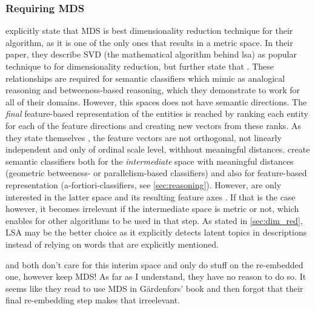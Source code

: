 \subsubsection{Requiring MDS}
\label{sec:discuss_mds}

\textcite{Derrac2015} explicitly state that MDS is best dimensionality reduction technique for their algorithm, as it is one of the only ones that results in a metric space. In their paper, they describe SVD (the mathematical algorithm behind \gls{lsa}) as popular technique to for dimensionality reduction, but further state that  \cite[14]{Derrac2015}. These relationships are required for semantic classifiers which mimic as analogical reasoning and betweeness-based reasoning, which they demonstrate to work for all of their domains. However, this spaces does not have semantic directions. The \textit{final} feature-based representation of the entities is reached by ranking each entity for each of the feature directions and creating new vectors from these ranks. As they state themselves \cite[22]{Derrac2015}, the feature vectors are not orthogonal, not linearly independent and only of ordinal scale level, withhout meaningful distances. \textcite{Derrac2015} create semantic classifiers both for the \textit{intermediate} space with meaningful distances (geometric betweeness- or parallelism-based classifiers) and also for feature-based representation (a-fortiori-classifiers, see \autoref{sec:reasoning}). However, \textcite{Ager2018,Alshaikh2020} are only interested in the latter space and its resulting feature axes . If that is the case however, it becomes irrelevant if the intermediate space is metric or not, which enables for other algorithms to be used in that step. As stated in \autoref{sec:dim_red}, LSA may be the better choice as it explicitly detects latent topics in descriptions instead of relying on words that are explicitly mentioned.  

\cite{Ager2018} and \cite{Alshaikh2020} both don't care for this interim space and only do stuff on the re-embedded one, however keep MDS! As far as I understand, they have no reason to do so. It seems like they read to use MDS in Gärdenfors' book and then forgot that their final re-embedding step makes that irreelevant. 

